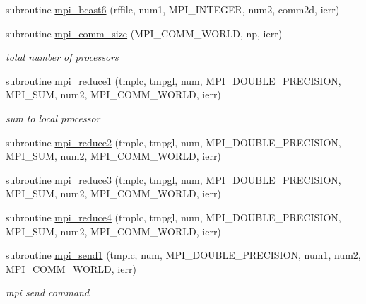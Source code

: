 \begin{DoxyCompactItemize}
\item 
subroutine \mbox{\hyperlink{namespacempistub_aca21309e40e0374a92a5e2a163110d1c}{mpi\+\_\+bcast6}} (rffile, num1, M\+P\+I\+\_\+\+I\+N\+T\+E\+G\+ER, num2, comm2d, ierr)
\item 
subroutine \mbox{\hyperlink{namespacempistub_a188b67a76569dcb918a27f48018e6baf}{mpi\+\_\+comm\+\_\+size}} (M\+P\+I\+\_\+\+C\+O\+M\+M\+\_\+\+W\+O\+R\+LD, np, ierr)
\begin{DoxyCompactList}\small\item\em total number of processors \end{DoxyCompactList}\item 
subroutine \mbox{\hyperlink{namespacempistub_a6ba478c1e620c237eb85776943b327ad}{mpi\+\_\+reduce1}} (tmplc, tmpgl, num, M\+P\+I\+\_\+\+D\+O\+U\+B\+L\+E\+\_\+\+P\+R\+E\+C\+I\+S\+I\+ON, M\+P\+I\+\_\+\+S\+UM, num2, M\+P\+I\+\_\+\+C\+O\+M\+M\+\_\+\+W\+O\+R\+LD, ierr)
\begin{DoxyCompactList}\small\item\em sum to local processor \end{DoxyCompactList}\item 
subroutine \mbox{\hyperlink{namespacempistub_a1b64afd5481e729d54724f7427b4a32f}{mpi\+\_\+reduce2}} (tmplc, tmpgl, num, M\+P\+I\+\_\+\+D\+O\+U\+B\+L\+E\+\_\+\+P\+R\+E\+C\+I\+S\+I\+ON, M\+P\+I\+\_\+\+S\+UM, num2, M\+P\+I\+\_\+\+C\+O\+M\+M\+\_\+\+W\+O\+R\+LD, ierr)
\item 
subroutine \mbox{\hyperlink{namespacempistub_a781c5f26f7ee9bdffdc195be7eaa07ef}{mpi\+\_\+reduce3}} (tmplc, tmpgl, num, M\+P\+I\+\_\+\+D\+O\+U\+B\+L\+E\+\_\+\+P\+R\+E\+C\+I\+S\+I\+ON, M\+P\+I\+\_\+\+S\+UM, num2, M\+P\+I\+\_\+\+C\+O\+M\+M\+\_\+\+W\+O\+R\+LD, ierr)
\item 
subroutine \mbox{\hyperlink{namespacempistub_ad1156be68f1c3c3dd3d844d6d4cee160}{mpi\+\_\+reduce4}} (tmplc, tmpgl, num, M\+P\+I\+\_\+\+D\+O\+U\+B\+L\+E\+\_\+\+P\+R\+E\+C\+I\+S\+I\+ON, M\+P\+I\+\_\+\+S\+UM, num2, M\+P\+I\+\_\+\+C\+O\+M\+M\+\_\+\+W\+O\+R\+LD, ierr)
\item 
subroutine \mbox{\hyperlink{namespacempistub_aa276a91b8fd09a5bf247b20692731dd8}{mpi\+\_\+send1}} (tmplc, num, M\+P\+I\+\_\+\+D\+O\+U\+B\+L\+E\+\_\+\+P\+R\+E\+C\+I\+S\+I\+ON, num1, num2, M\+P\+I\+\_\+\+C\+O\+M\+M\+\_\+\+W\+O\+R\+LD, ierr)
\begin{DoxyCompactList}\small\item\em mpi send command \end{DoxyCompactList}\item 

\end{DoxyCompactItemize}
